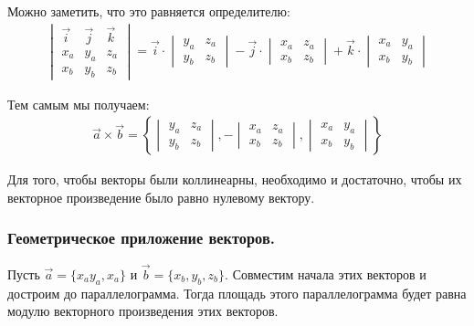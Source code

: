 Можно заметить, что это равняется определителю:
\begin{gather*}
  \begin{vmatrix}
    \vec{i} & \vec{j} & \vec{k} \\
    x_a & y_a & z_a \\
    x_b & y_b & z_b 
  \end{vmatrix} = 
  \vec{i} \cdot
  \begin{vmatrix}
    y_a & z_a \\
    y_b & z_b 
  \end{vmatrix}
  - \vec{j} \cdot
  \begin{vmatrix}
    x_a & z_a \\
    x_b & z_b
  \end{vmatrix}
  + \vec{k} \cdot 
  \begin{vmatrix}
    x_a & y_a \\
    x_b & y_b
  \end{vmatrix}
\end{gather*}

Тем самым мы получаем:
\begin{gather*}
  \boxed{
    \vec{a} \times \vec{b} = 
    \left\{ \begin{vmatrix}
        y_a & z_a \\
        y_b & z_b 
    \end{vmatrix},
    - \begin{vmatrix}
      x_a & z_a \\
      x_b & z_b 
    \end{vmatrix},
    \begin{vmatrix}
      x_a & y_a \\
      x_b & y_b
    \end{vmatrix}
  \right\}
}
\end{gather*}

\begin{theorem}
  Для того, чтобы векторы были коллинеарны, необходимо и достаточно, чтобы их векторное произведение было равно нулевому вектору.
\end{theorem}

\subsubsection{Геометрическое приложение векторов.}
Пусть $\vec{a} = \{x_a y_a, x_a\}$ и $\vec{b} = \{x_b, y_b, z_b\}$. Совместим начала этих векторов и достроим до параллелограмма. Тогда площадь этого параллелограмма будет равна модулю векторного произведения этих векторов.

